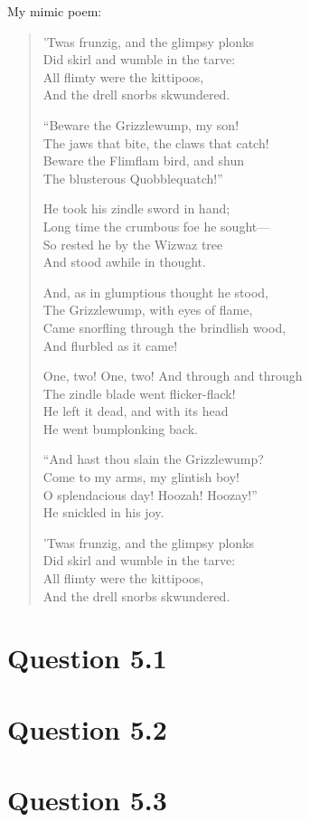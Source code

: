\documentclass{article}
\begin{document}
My mimic poem:
\begin{verse}
'Twas frunzig, and the glimpsy plonks \\
Did skirl and wumble in the tarve: \\
All flimty were the kittipoos, \\
And the drell snorbs skwundered.

``Beware the Grizzlewump, my son! \\
The jaws that bite, the claws that catch! \\
Beware the Flimflam bird, and shun \\
The blusterous Quobblequatch!''

He took his zindle sword in hand; \\
Long time the crumbous foe he sought--- \\
So rested he by the Wizwaz tree \\
And stood awhile in thought.

And, as in glumptious thought he stood, \\
The Grizzlewump, with eyes of flame, \\
Came snorfling through the brindlish wood, \\
And flurbled as it came!

One, two! One, two! And through and through \\
The zindle blade went flicker-flack! \\
He left it dead, and with its head \\
He went bumplonking back.

``And hast thou slain the Grizzlewump? \\
Come to my arms, my glintish boy! \\
O splendacious day! Hoozah! Hoozay!'' \\
He snickled in his joy.

'Twas frunzig, and the glimpsy plonks \\
Did skirl and wumble in the tarve: \\
All flimty were the kittipoos, \\
And the drell snorbs skwundered.

\end{verse}

\section*{Question 5.1}

\section*{Question 5.2}

\section*{Question 5.3}
\end{document}
